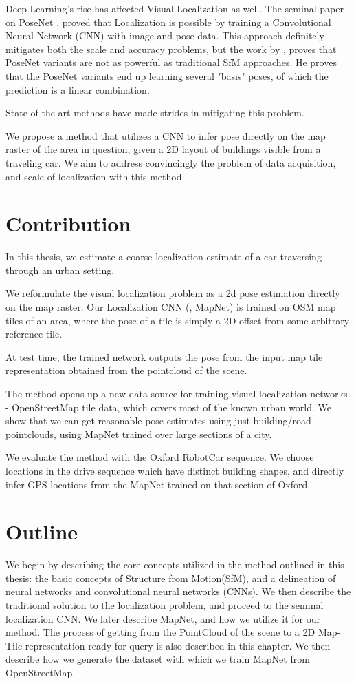 Deep Learning's rise has affected Visual Localization as well. The seminal paper on PoseNet \cite{Kendall2015}, proved that Localization is possible by training a Convolutional Neural Network (CNN) with image and pose data. This approach definitely mitigates both the scale and accuracy problems, but the work by \cite{Sattler2019}, proves that PoseNet variants are not as powerful as traditional SfM approaches. He proves that the PoseNet variants end up learning several "basis" poses, of which the prediction is a linear combination.  

State-of-the-art methods have made strides in mitigating this problem.

We propose a method that utilizes a CNN to infer pose directly on the map raster of the area in question, given a 2D layout of buildings visible from a traveling car. We aim to address convincingly the problem of data acquisition, and scale of localization with this method.  

\section{Contribution}
In this thesis, we estimate a coarse localization estimate of a car traversing through an urban setting. 

We reformulate the visual localization problem as a 2d pose estimation directly on the map raster. Our Localization CNN (\cite{Brahmbhatt2018}, MapNet) is trained on OSM map tiles of an area, where the pose of a tile is simply a 2D offset from some arbitrary reference tile.

At test time, the trained network outputs the pose from the input map tile representation obtained from the pointcloud of the scene.

The method opens up a new data source for training visual localization networks - OpenStreetMap tile data, which covers most of the known urban world. We show that we can get reasonable pose estimates using just building/road pointclouds, using MapNet trained over large sections of a city. 

We evaluate the method with the Oxford RobotCar sequence. We choose locations in the drive sequence which have distinct building shapes, and directly infer GPS locations from the MapNet trained on that section of Oxford. 

\section{Outline}
We begin by describing the core concepts utilized in the method outlined in this thesis: the basic concepts of Structure from Motion(SfM), and a delineation of neural networks and convolutional neural networks (CNNs). We then describe the traditional solution to the localization problem, and proceed to the seminal localization CNN. We later describe MapNet, and how we utilize it for our method. The process of getting from the PointCloud of the scene to a 2D Map-Tile representation ready for query is also described in this chapter. We then describe how we generate the dataset with which we train MapNet from OpenStreetMap.

